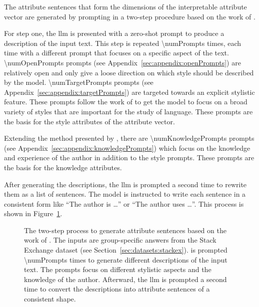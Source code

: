 The attribute sentences that form the dimensions of the interpretable attribute vector are generated by prompting  in a two-step procedure based on the work of \citet{patelLearningInterpretableStyle2023}.

For step one, the \ac{llm} is presented with a zero-shot prompt to produce a description of the input text. This step is repeated \num{\numPrompts} times, each time with a different prompt that focuses on a specific aspect of the text. \num{\numOpenPrompts} prompts (see Appendix~\ref{sec:appendix:openPrompts}) are relatively open and only give a loose direction on which style should be described by the model. \num{\numTargetPrompts} prompts (see Appendix~\ref{sec:appendix:targetPrompts}) are targeted towards an explicit stylistic feature. These prompts follow the work of \citet{patelLearningInterpretableStyle2023,tausczikPsychologicalMeaningWords2010} to get the model to focus on a broad variety of styles that are important for the study of language. These prompts are the basis for the style attributes of the attribute vector.

Extending the method presented by \citet{patelLearningInterpretableStyle2023}, there are \num{\numKnowledgePrompts} prompts (see Appendix~\ref{sec:appendix:knowledgePrompts}) which focus on the knowledge and experience of the author in addition to the style prompts. These prompts are the basis for the knowledge attributes.

After generating the descriptions, the \ac{llm} is prompted a second time to rewrite them as a list of sentences. The model is instructed to write each sentence in a consistent form like \enquote{The author is \ldots} or \enquote{The author uses \ldots}. This process is shown in Figure~\ref{fig:attributeSentenceGeneration}.

\begin{figure}[ht]
  
  \caption{The two-step process to generate attribute sentences based on the work of \citet{patelLearningInterpretableStyle2023}. The inputs are group-specific answers from the Stack Exchange dataset (see Section~\ref{sec:datasets:stackex}).  is prompted \num{\numPrompts} times to generate different descriptions of the input text. The prompts focus on different stylistic aspects and the knowledge of the author. Afterward, the \ac{llm} is prompted a second time to convert the descriptions into attribute sentences of a consistent shape.}%
  \label{fig:attributeSentenceGeneration}
\end{figure}

